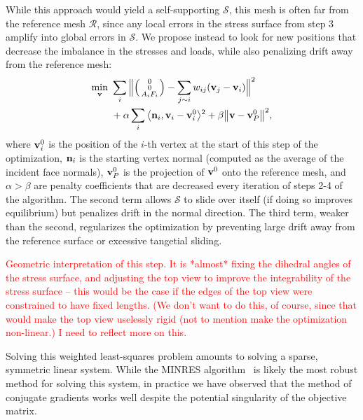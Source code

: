 \documentclass[annual]{acmsiggraph}
\makeatletter
\def\<{\mathchoice{\big\langle}{\langle}{\langle}{\langle}}
\def\>{\mathchoice{\big\rangle}{\rangle}{\rangle}{\rangle}}
\def\Forcevector{\Big(\mbox{\scriptsize
	\def\arraystretch{0.8}\begin{tabular}{@{\,}c@{\,}}
	0 \\ 0 \\ $A_i F_i$
	\end{tabular}}\Big)}
\def\SS{{\mathcal S}}
\def\RR{{\mathcal R}}
\newcommand{\todo}[1]{\textcolor{red}{#1}}
\makeatother
\begin{document}
While this approach would yield a self-supporting $\SS$, this mesh is 
often far from the reference mesh $\RR$, since any local errors in the 
stress surface from step 3 amplify into global errors in $\SS$. We propose 
instead to look for new positions that decrease the imbalance in the 
stresses and loads, while also penalizing drift away from the reference 
mesh:
	\begin{align*}
	\min_{\vw}
	\ &
	\sum_i \Big\|
		\Forcevector -
		\sum_{j\sim i} w_{ij} (\vw_j - \vw_i)
		\Big\|^2 
	\\ &
	+ \alpha \sum_i 
		\<\nw_i, \vw_i - \vw^0_i \>^2 
		+ \beta \big\|\vw - \vw^0_P\big\|^2,
\end{align*}
 where ${\mathbf v}^0_i$ is the position of the $i$-th vertex at the start of this 
step of the optimization, ${\mathbf n}_i$ is the starting vertex normal (computed 
as the average of the incident face normals), ${\mathbf v}^0_P$ is the projection 
of ${\mathbf v}^0$ onto the reference mesh, and $\alpha > \beta$ are penalty 
coefficients that are decreased every iteration of steps 2-4 of the 
algorithm. The second term allows $\SS$ to slide over itself (if doing so 
improves equilibrium) but penalizes drift in the normal direction. The 
third term, weaker than the second, regularizes the optimization by 
preventing large drift away from the reference surface or excessive 
tangetial sliding.

\todo{Geometric interpretation of this step. It is *almost* fixing the 
dihedral angles of the stress surface, and adjusting the top view to 
improve the integrability of the stress surface -- this would be the case 
if the edges of the top view were constrained to have fixed lengths. (We 
don't want to do this, of course, since that would make the top view 
uselessly rigid (not to mention make the optimization non-linear.) I need 
to reflect more on this.}

Solving this weighted least-squares problem amounts to solving a sparse, 
symmetric linear system. While the MINRES algorithm~\cite{TODO} is likely 
the most robust method for solving this system, in practice we have 
observed that the method of conjugate gradients works well despite the 
potential singularity of the objective matrix.
\end{document}
